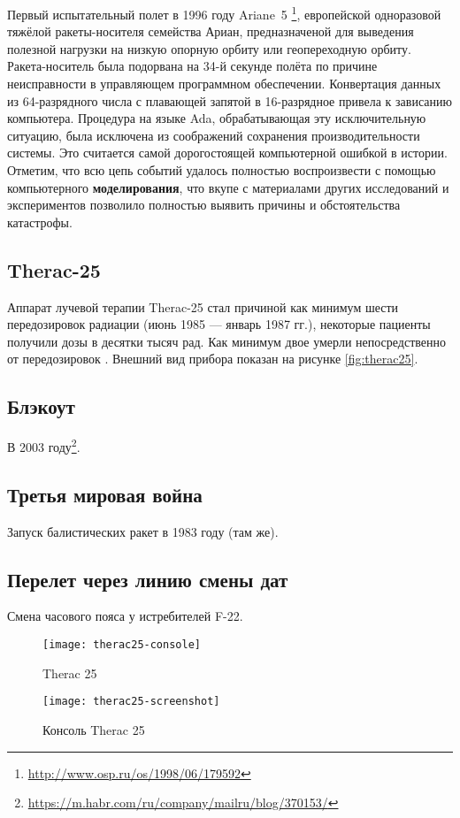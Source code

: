 Первый испытательный полет в 1996 году Ariane~5 \cite{journal:open_system:1998_adjaev}\footnote{\url{http://www.osp.ru/os/1998/06/179592}},
европейской одноразовой тяжёлой ракеты-носителя семейства Ариан,
предназначеной для выведения полезной нагрузки на низкую опорную орбиту или геопереходную орбиту. 
%
Ракета-носитель была подорвана на 34-й секунде полёта по причине неисправности в управляющем программном обеспечении.
Конвертация данных из 64-разрядного числа с плавающей запятой в 16-разрядное привела к зависанию компьютера.
Процедура на языке Ada, обрабатывающая эту исключительную ситуацию, была исключена из соображений сохранения производительности системы.
%
Это считается самой дорогостоящей компьютерной ошибкой в истории.
Отметим, что всю цепь событий удалось полностью воспроизвести с помощью компьютерного \textbf{моделирования}, что вкупе с материалами других исследований и экспериментов позволило полностью выявить причины и обстоятельства катастрофы.
%
%
\subsection{Therac-25}

Аппарат лучевой терапии Therac-25 стал причиной как минимум шести передозировок радиации (июнь 1985 --- январь 1987 гг.),
некоторые пациенты получили дозы в десятки тысяч рад. Как минимум двое умерли непосредственно от передозировок \cite{journal:computer:1993:therac25}.
Внешний вид прибора показан на рисунке \ref{fig:therac25}.
%
%
\subsection{Блэкоут}
В 2003 году\footnote{\url{https://m.habr.com/ru/company/mailru/blog/370153/}}.
%
%
\subsection{Третья мировая война} %
Запуск балистических ракет в 1983 году (там же).
%
%
\subsection{Перелет через линию смены дат}
Смена часового пояса у истребителей F-22. 

\begin{center}
\begin{figure}[hb]
    \texttt{[image: therac25-console]}
    \caption{Therac 25}\label{fig:therac25}
    \texttt{[image: therac25-screenshot]}
    \caption{Консоль Therac 25}\label{fig:therac25_console}
\end{figure}
\end{center}
